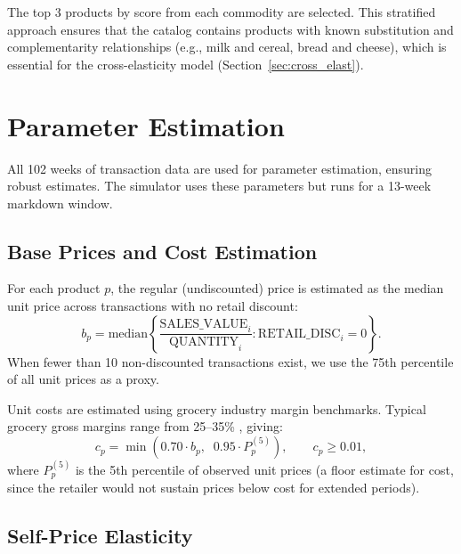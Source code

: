 \documentclass[11pt,a4paper]{article}
\begin{document}
The top 3 products by score from each commodity are selected.
This stratified approach ensures that the catalog contains products with known substitution and complementarity relationships (e.g., milk and cereal, bread and cheese), which is essential for the cross-elasticity model (Section~\ref{sec:cross_elast}).

\section{Parameter Estimation}
\label{sec:params}

All 102 weeks of transaction data are used for parameter estimation, ensuring robust estimates.
The simulator uses these parameters but runs for a 13-week markdown window.

\subsection{Base Prices and Cost Estimation}

For each product $p$, the regular (undiscounted) price is estimated as the median unit price across transactions with no retail discount:
\begin{equation}
b_p = \text{median}\left\{\frac{\text{SALES\_VALUE}_i}{\text{QUANTITY}_i} : \text{RETAIL\_DISC}_i = 0\right\}.
\end{equation}
When fewer than 10 non-discounted transactions exist, we use the 75th percentile of all unit prices as a proxy.

Unit costs are estimated using grocery industry margin benchmarks.
Typical grocery gross margins range from 25--35\% \citep{fmi2020}, giving:
\begin{equation}
c_p = \min\left(0.70 \cdot b_p,\;\; 0.95 \cdot P_p^{(5)}\right), \qquad c_p \geq 0.01,
\end{equation}
where $P_p^{(5)}$ is the 5th percentile of observed unit prices (a floor estimate for cost, since the retailer would not sustain prices below cost for extended periods).

\subsection{Self-Price Elasticity}
\label{sec:self_elast}
\end{document}
